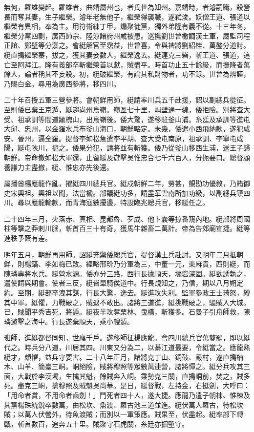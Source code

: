 \begin{pinyinscope}
無何，羅雄變起。羅雄者，曲靖屬州也，者氏世為知州。嘉靖時，者濬嗣職，殺營長而奪其妻，生子繼榮。濬年老無他子，繼榮得襲職，遂弒浚。妖僧王道、張道以繼榮有異相，奉為主。用符術練丁甲，煽聚徒黨，獨外弟隆有義不從。十三年冬，繼榮分黨四剽，廣西師宗、陸涼諸府州咸被患。巡撫劉世曾檄調漢土軍，屬監司程正誼、鄭璧等分禦之。會綎解官至霑益，世曾喜，令與裨將劉紹桂、萬鏊分道討。綎直搗繼榮寨，拔之，獲其妻妾數人，繼榮逸去。綎連克三砦，斬王道、張道，追亡至阿拜江。隆有義部卒斬繼榮首以獻，賊盡平。時首功止五十餘級，而撫降者萬餘人，論者稱其不妄殺。初，綎破繼榮，有論其私財物者，功不錄。世曾為辨誣，乃賜白金。尋用為廣西參將，移四川。

二十年召授五軍三營參將。會朝鮮用師，綎請率川兵五千赴援，詔以副總兵從征。至則倭已棄王京遁，綎趨尚州烏嶺。嶺亙七十里，峭壁通一線，倭拒險。別將查大受、祖承訓等間道踰槐山，出烏嶺後。倭大驚，遂移駐釜山浦。糸廷及承訓等進屯大邱、忠州，以金羅水兵布釜山海口，朝鮮略定。未幾，倭遣小西飛納款，遂犯咸安、晉州，逼全羅。提督李如松急遣李平胡、查大受屯南原，祖承訓、李寧屯咸陽，綎屯陜川，扼之。倭果分犯，請將並有斬獲。倭乃從釜山移西生浦，送王子歸朝鮮。帝命撤如松大軍還，止留綎及遊擊吳惟忠合七千六百人，分扼要口。總督顧養謙力主盡撤，綎、惟忠亦先後還。

屬播酋楊應龍作亂，擢綎四川總兵官。綎戍朝鮮二年，勞甚，覬勘功優敘，乃賄御史宋興祖。興祖以聞，法當褫。部議綎功多，請盡革雲南所加功級，以副總兵鎮四川。尋以應龍輸款，而青海寇數擾邊，特設臨兆總兵官，移綎任之。

二十四年三月，火落赤、真相、昆都魯、歹成、他卜囊等掠番窺內地。綎部將周國柱等擊之莽剌川腦，斬首百三十有奇，獲馬牛雜畜二萬計。帝為告郊廟宣捷。綎等進秩予蔭有差。

明年五月，朝鮮再用師。詔綎充禦倭總兵官，提督漢土兵赴討。又明年二月抵朝鮮，則楊鎬、李如梅已敗。經略邢玠乃分軍為三，中董一元，東麻貴，西則綎，而陳璘專將水兵。綎營水源。倭亦分三路，西行長據順天，壕砦深固。綎欲誘執之，遣使請與期會。使者三反，綎皆單騎俟道中。行長覘知之，乃信，期以八月朔定約。至期，綎部卒洩其謀，行長大驚，逸去。綎進攻失利。監軍參政王士琦怒，縛其中軍。綎懼，力戰破之，賊退不敢出。諸將三道進，綎挑戰破之，驅賊入大城。已，賊聞平秀吉死，將遁。綎夜半攻奪栗林、曳橋，斬獲多。石曼子引舟師救，陳璘邀擊之海中。行長遂棄順天，乘小艘遁。

班師，進綎都督同知，世廕千戶。遂移師征楊應龍。會四川總兵官萬鏊罷，即以綎代之。時兵分八道，川居其四。川東又分為二，以綦江道最要，令綎當之。應龍熟綎才，頗懼，益兵守要害。二十八年正月，諸將克丁山、銅鼓、嚴村，遂直搗楠木、山羊、簡臺三峒。峒絕險，賊將穆照等眾數萬連營，諸將憚之。綎分兵攻其三面，大戰於李漢壩，生擒其魁，餘賊奔入峒。乘勢克三關，直搗峒前，焚之，賊多死。盡克三峒，擒穆照及賊魁吳尚華。是日，綎督戰，左持金，右挺劍，大呼曰：「用命者賞，不用命者齒劍！」鬥死者四十人，遂大捷。應龍乃遣子朝棟、惟棟及其黨楊珠統銳卒數萬，由松坎、魚渡、羅古池三道並進。綎伏萬人羅古，待松坎賊；以萬人伏營外，待魚渡賊；而別以一軍策應。賊果至，伏盡起。綎率部下轉戰，斬首數百，追奔五十里。賊聚守石虎關，糸廷亦掘塹守。


\end{pinyinscope}
